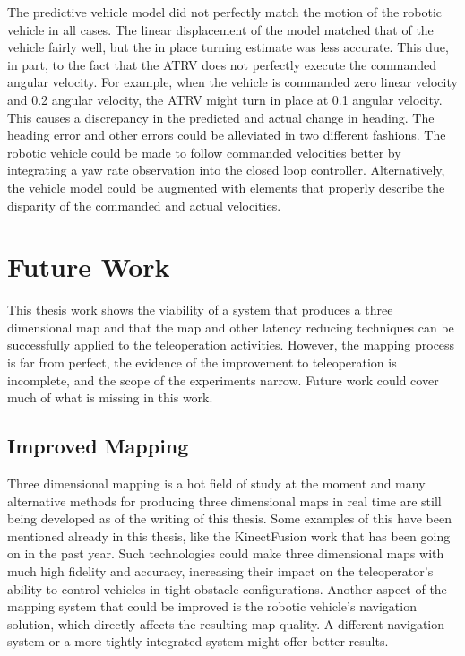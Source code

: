 \documentclass[12pt]{report}
\begin{document}
The predictive vehicle model did not perfectly match the motion of the robotic vehicle in all cases.  The linear displacement of the model matched that of the vehicle fairly well, but the in place turning estimate was less accurate.  This due, in part, to the fact that the ATRV does not perfectly execute the commanded angular velocity.  For example, when the vehicle is commanded zero linear velocity and 0.2 angular velocity, the ATRV might turn in place at 0.1 angular velocity.  This causes a discrepancy in the predicted and actual change in heading.  The heading error and other errors could be alleviated in two different fashions.  The robotic vehicle could be made to follow commanded velocities better by integrating a yaw rate observation into the closed loop controller.  Alternatively, the vehicle model could be augmented with elements that properly describe the disparity of the commanded and actual velocities.

\section{Future Work}
This thesis work shows the viability of a system that produces a three dimensional map and that the map and other latency reducing techniques can be successfully applied to the teleoperation activities.  However, the mapping process is far from perfect, the evidence of the improvement to teleoperation is incomplete, and the scope of the experiments narrow.  Future work could cover much of what is missing in this work.

\subsection{Improved Mapping}
Three dimensional mapping is a hot field of study at the moment and many alternative methods for producing three dimensional maps in real time are still being developed as of the writing of this thesis.  Some examples of this have been mentioned already in this thesis, like the KinectFusion work that has been going on in the past year\cite{izadi2011kinectfusion}.  Such technologies could make three dimensional maps with much high fidelity and accuracy, increasing their impact on the teleoperator's ability to control vehicles in tight obstacle configurations.  Another aspect of the mapping system that could be improved is the robotic vehicle's navigation solution, which directly affects the resulting map quality.  A different navigation system or a more tightly integrated system might offer better results.
\end{document}
